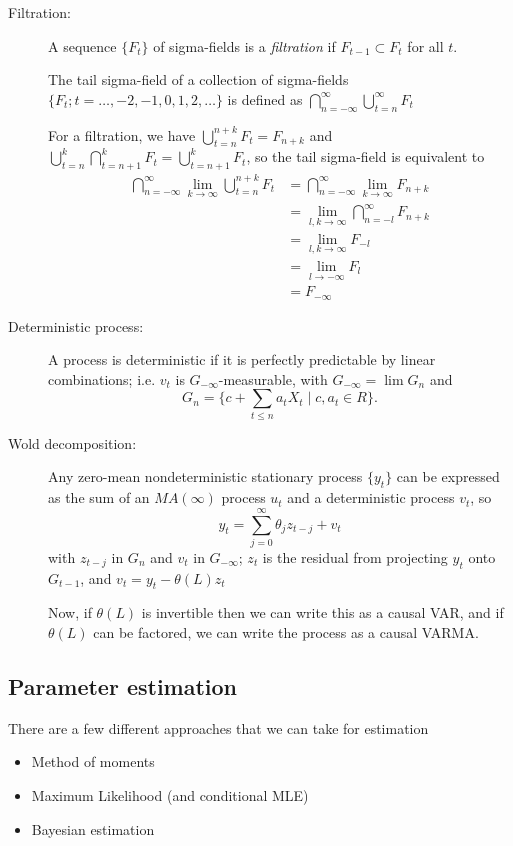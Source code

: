 \begin{description}
\item[Filtration:]
  A sequence $\{F_t\}$ of sigma-fields is a \emph{filtration} if
  $F_{t-1} ⊂ F_t$ for all $t$.

  The tail sigma-field of a collection of sigma-fields $\{F_t;
  t=\dots,-2,-1,0,1,2,\dots\}$ is defined as $\bigcap_{n=-\infty}^\infty \bigcup_{t=n}^\infty F_t$

  For a filtration, we have $\bigcup_{t=n}^{n+k} F_t = F_{n+k}$ and
  $\bigcup_{t=n}^k \bigcap_{t=n+1}^k F_t = \bigcup_{t=n+1}^k F_t$, so the tail
  sigma-field is equivalent to
  \begin{align}
    \bigcap_{n=-\infty}^\infty \lim_{k \to \infty} \bigcup_{t=n}^{n+k} F_t
    &= \bigcap_{n=-\infty}^\infty \lim_{k \to \infty} F_{n+k} \\
    &= \lim_{l,k \to \infty} \bigcap_{n=-l}^\infty F_{n+k} \\
    &= \lim_{l,k \to \infty} F_{-l} \\
    &= \lim_{l \to -\infty} F_l \\
    &= F_{-\infty}
  \end{align}

\item[Deterministic process:]
  A process is deterministic if it is perfectly predictable by linear
  combinations; i.e. $v_t$ is $G_{-\infty}$-measurable, with $G_{-\infty} = \lim
  G_n$ and
  \[G_n = \{c + \sum_{t \leq n} a_t X_t ∣ c, a_t \in R\}.\]
\item[Wold decomposition:]
Any zero-mean nondeterministic stationary process $\{y_t\}$ can be
expressed as the sum of an $MA(\infty)$ process $u_t$ and a deterministic
process $v_t$, so
\[y_t = \sum_{j=0}^\infty \theta_j z_{t-j} + v_t\]
with $z_{t-j}$ in $G_n$ and $v_t$ in $G_{-\infty}$; $z_t$ is the residual
from projecting $y_t$ onto $G_{t-1}$, and $v_t = y_t - \theta(L) z_t$

Now, if $\theta(L)$ is invertible then we can write this as a causal VAR,
and if $\theta(L)$ can be factored, we can write the process as a causal
VARMA.
\end{description}

\subsection{Parameter estimation}

There are a few different approaches that we can take for estimation
\begin{itemize}
\item Method of moments
\item Maximum Likelihood (and conditional MLE)
\item Bayesian estimation
\end{itemize}

